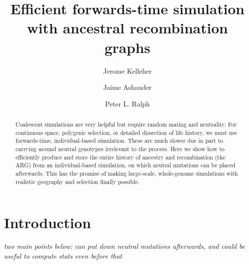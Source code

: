 \documentclass{article}
\newcommand{\plr}[1]{{\em \color{blue} #1}}
\begin{document}
\title{Efficient forwards-time simulation with ancestral recombination graphs}
\author[1]{Jerome Kelleher}
\author[2]{Jaime Ashander}
\author[3]{Peter L. Ralph}
\maketitle


\begin{abstract}
Coalescent simulations are very helpful but require random mating and neutrality.
For continuous space, polygenic selection, or detailed dissection of life history, 
we must use forwards-time, individual-based simulation.
These are much slower due in part to carrying around neutral genotypes irrelevant to the process.
Here we show how to efficiently produce and store the entire history of ancestry and recombination
(the ARG) from an individual-based simulation,
on which neutral mutations can be placed afterwards.
This has the promise of making large-scale, whole-genome simulations with realistic geography and selection finally possible.
\end{abstract}


\section*{Introduction}

\plr{two main points below: can put down neutral mutations afterwards, and could be useful to compute stats even before that}
\end{document}
